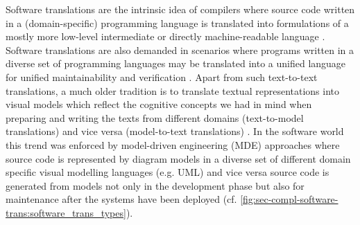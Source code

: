 Software translations are the intrinsic idea of compilers where source code written in a (domain-specific) programming language is translated into formulations of a mostly more low-level intermediate or directly machine-readable language \cite{Aho:1986:CPT:6448,Stanier:2013:IRI:2480741.2480743}.
Software translations are also demanded in scenarios where programs written in a diverse set of programming languages may be translated into a unified language for unified maintainability and verification \cite{DBLP:conf/icmt/0001GNEBMPEE14}.
Apart from such text-to-text translations, a much older tradition is to translate textual representations into visual models which reflect the cognitive concepts we had in mind when preparing and writing the texts from different domains (text-to-model translations) \cite{striewe_08_using} and vice versa (model-to-text translations) \cite{jsc12}.
In the software world this trend was enforced by model-driven engineering (MDE) approaches \cite{6507223} where source code is represented by diagram models in a diverse set of different domain specific visual modelling languages (e.g. UML) and vice versa source code is generated from models not only in the development phase but also for maintenance after the systems have been deployed (cf. \cref{fig:sec-compl-software-trans:software_trans_types}).

